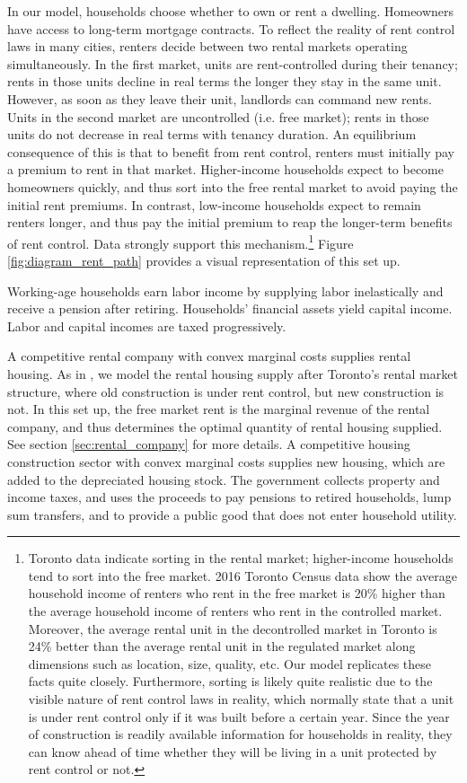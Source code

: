 \documentclass[parskip=full]{article}
\begin{document}
In our model, households choose whether to own or rent a dwelling. Homeowners have access to long-term mortgage contracts. To reflect the reality of rent control laws in many cities, renters decide between two rental markets operating simultaneously. In the first market, units are rent-controlled during their tenancy; rents in those units decline in real terms the longer they stay in the same unit. However, as soon as they leave their unit, landlords can command new rents. Units in the second market are uncontrolled (i.e. free market); rents in those units do not decrease in real terms with tenancy duration. An equilibrium consequence of this is that to benefit from rent control, renters must initially pay a premium to rent in that market. Higher-income households expect to become homeowners quickly, and thus sort into the free rental market to avoid paying the initial rent premiums. In contrast, low-income households expect to remain renters longer, and thus pay the initial premium to reap the longer-term benefits of rent control. Data strongly support this mechanism.\footnote{Toronto data indicate sorting in the rental market; higher-income households tend to sort into the free market. 2016 Toronto Census data show the average household income of renters who rent in the free market is 20\% higher than the average household income of renters who rent in the controlled market. Moreover, the average rental unit in the decontrolled market in Toronto is 24\% better than the average rental unit in the regulated market \citep{zhang-gou} along dimensions such as location, size, quality, etc. Our model replicates these facts quite closely. Furthermore, sorting is likely quite realistic due to the visible nature of rent control laws in reality, which normally state that a unit is under rent control only if it was built before a certain year. Since the year of construction is readily available information for households in reality, they can know ahead of time whether they will be living in a unit protected by rent control or not.} Figure \ref{fig:diagram_rent_path} provides a visual representation of this set up.

Working-age households earn labor income by supplying labor inelastically and receive a pension after retiring. Households' financial assets yield capital income. Labor and capital incomes are taxed progressively.

A competitive rental company with convex marginal costs supplies rental housing. As in \citet{fallis-1985}, we model the rental housing supply after Toronto's rental market structure, where old construction is under rent control, but new construction is not. In this set up, the free market rent is the marginal revenue of the rental company, and thus determines the optimal quantity of rental housing supplied. See section \ref{sec:rental_company} for more details. A competitive housing construction sector with convex marginal costs supplies new housing, which are added to the depreciated housing stock. The government collects property and income taxes, and uses the proceeds to pay pensions to retired households, lump sum transfers, and to provide a public good that does not enter household utility. 
\end{document}
